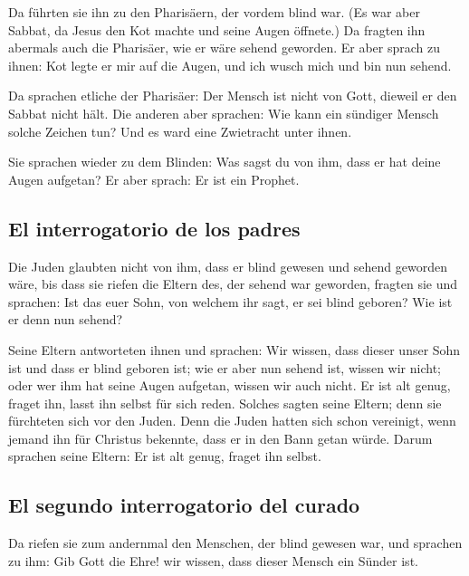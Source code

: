  Da führten sie ihn zu den Pharisäern, der vordem blind
war.  (Es war aber Sabbat, da Jesus den Kot machte und
seine Augen öffnete.)  Da fragten ihn abermals auch die
Pharisäer, wie er wäre sehend geworden. Er aber sprach zu ihnen: Kot
legte er mir auf die Augen, und ich wusch mich und bin nun sehend.

 Da sprachen etliche der Pharisäer: Der Mensch ist nicht
von Gott, dieweil er den Sabbat nicht hält. Die anderen aber sprachen:
Wie kann ein sündiger Mensch solche Zeichen tun? Und es ward eine
Zwietracht unter ihnen.

 Sie sprachen wieder zu dem Blinden: Was sagst du von
ihm, dass er hat deine Augen aufgetan? Er aber sprach: Er ist ein
Prophet.

\hypertarget{el-interrogatorio-de-los-padres}{%
\subsection{El interrogatorio de los
padres}\label{el-interrogatorio-de-los-padres}}

 Die Juden glaubten nicht von ihm, dass er blind gewesen
und sehend geworden wäre, bis dass sie riefen die Eltern des, der sehend
war geworden,  fragten sie und sprachen: Ist das euer
Sohn, von welchem ihr sagt, er sei blind geboren? Wie ist er denn nun
sehend?

 Seine Eltern antworteten ihnen und sprachen: Wir wissen,
dass dieser unser Sohn ist und dass er blind geboren ist;
 wie er aber nun sehend ist, wissen wir nicht; oder wer
ihm hat seine Augen aufgetan, wissen wir auch nicht. Er ist alt genug,
fraget ihn, lasst ihn selbst für sich reden.  Solches
sagten seine Eltern; denn sie fürchteten sich vor den Juden. Denn die
Juden hatten sich schon vereinigt, wenn jemand ihn für Christus
bekennte, dass er in den Bann getan würde.  Darum
sprachen seine Eltern: Er ist alt genug, fraget ihn selbst.

\hypertarget{el-segundo-interrogatorio-del-curado}{%
\subsection{El segundo interrogatorio del
curado}\label{el-segundo-interrogatorio-del-curado}}

 Da riefen sie zum andernmal den Menschen, der blind
gewesen war, und sprachen zu ihm: Gib Gott die Ehre! wir wissen, dass
dieser Mensch ein Sünder ist.

